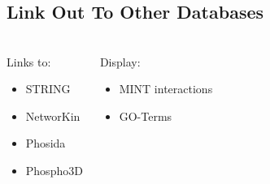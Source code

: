 \documentclass[a4paper,10pt,xcolor=pdftex,dvipsnames,table]{beamer}
\begin{document}
\subsection{Link Out To Other Databases}
\begin{frame}[t]\frametitle{\insertsubsection}
    \phosphoelmlogo
    \note{~}
        \begin{columns}
            \begin{exampleblock}{Links to:}
                \begin{itemize}
                    \item STRING
                    \item NetworKin
                    \item Phosida
                    \item Phospho3D
                \end{itemize}
            \end{exampleblock}
            \begin{exampleblock}{Display:}
                \begin{itemize}
                    \item MINT interactions
                    \item GO-Terms
                \end{itemize}
            \end{exampleblock}
        \\ 
        \end{columns}
\end{frame}
\end{document}

